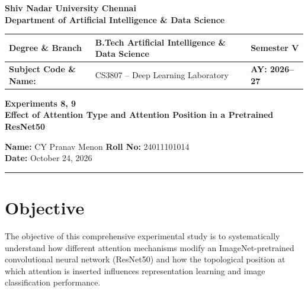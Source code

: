 \documentclass[11pt,a4paper]{article}
\begin{document}
\begin{center}
\large \textbf{Shiv Nadar University Chennai} \\[2pt]
\normalsize \textbf{Department of Artificial Intelligence \& Data Science} \\[4pt]
\begin{tabular}{|p{}|p{}|p{}|}
\hline
\textbf{Degree \& Branch} & B.Tech Artificial Intelligence \& Data Science & \textbf{Semester V} \\ \hline
\textbf{Subject Code \& Name:} & CS3807 -- Deep Learning Laboratory & \textbf{AY: 2026--27} \\ \hline
\end{tabular}
\end{center}

\vspace{0.5em}

\begin{center}
{\LARGE \textbf{Experiments 8, 9}} \\[6pt]
{\large \textbf{Effect of Attention Type and Attention Position in a Pretrained ResNet50}}
\end{center}

\vspace{0.4em}
\noindent \textbf{Name:} CY Pranav Menon \hfill \textbf{Roll No:} 24011101014 \\
\textbf{Date:} October 24, 2026
\vspace{0.5em}
\hrule
\vspace{1em}

\section{Objective}
The objective of this comprehensive experimental study is to systematically understand how different attention mechanisms modify an ImageNet-pretrained convolutional neural network (ResNet50) and how the topological position at which attention is inserted influences representation learning and image classification performance. 
\end{document}
